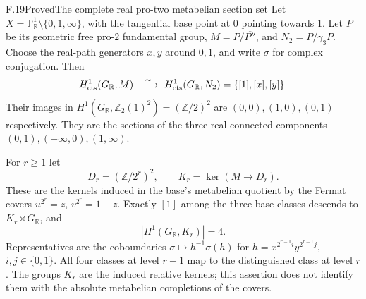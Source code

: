 \begin{statement}{F.19}{Proved}{The complete real pro-two metabelian section set}
Let $X=\mathbb P^1_{\mathbb R}\setminus\{0,1,\infty\}$,
with the tangential base point at $0$ pointing towards $1$.
Let $P$ be its geometric free pro-$2$ fundamental group,
$M=P/\overline{P''}$, and $N_2=P/\overline{\gamma_3P}$.
Choose the real-path generators $x,y$ around $0,1$, and
write $\sigma$ for complex conjugation. Then
\[
 H^1_{\rm cts}(G_{\mathbb R},M)
 \ \xrightarrow{\ \sim\ }\
 H^1_{\rm cts}(G_{\mathbb R},N_2)
 =\{[1],[x],[y]\}.
\]
Their images in
$H^1(G_{\mathbb R},\mathbb Z_2(1)^2)=(\mathbb Z/2)^2$
are $(0,0),(1,0),(0,1)$ respectively. They are the
sections of the three real connected components
$(0,1),(-\infty,0),(1,\infty)$.

For $r\ge1$ let
\[
 D_r=(\mathbb Z/2^r)^2,\qquad
 K_r=\ker(M\longrightarrow D_r).
\]
These are the kernels induced in the base's metabelian
quotient by the Fermat covers
$u^{2^r}=z$, $v^{2^r}=1-z$.
Exactly $[1]$ among the three base classes descends to
$K_r\rtimes G_{\mathbb R}$, and
\[
 |H^1(G_{\mathbb R},K_r)|=4.
\]
Representatives are the coboundaries
$\sigma\mapsto h^{-1}\sigma(h)$ for
$h=x^{2^{r-1}i}y^{2^{r-1}j}$, $i,j\in\{0,1\}$.
All four classes at level $r+1$ map to the distinguished
class at level $r$. The groups $K_r$ are the induced
relative kernels; this assertion does not identify them
with the absolute metabelian completions of the covers.
\end{statement}
